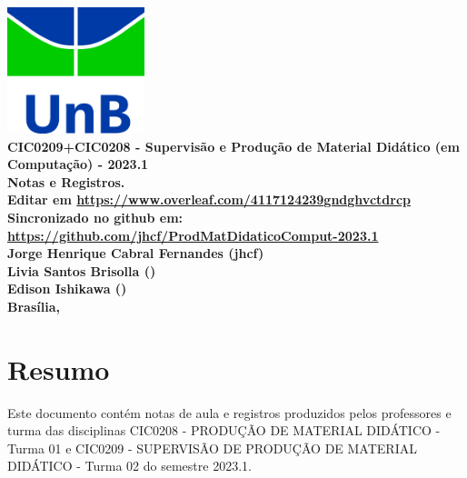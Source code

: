 \documentclass[12pt]{book}
\begin{document}
\clearpage
\thispagestyle{empty}

\begin{titlepage}
\begin{center}
 {\huge\bfseries \includegraphics[width=4cm]{unb-logo.jpg}\\
	CIC0209+CIC0208 - Supervisão e Produção de Material Didático (em Computação) - 2023.1\\
 Notas e Registros.\\
 Editar em \url{https://www.overleaf.com/4117124239gndghvctdrcp}\\
 Sincronizado no github em:
\url{https://github.com/jhcf/ProdMatDidaticoComput-2023.1}\\
 \vspace{1.5cm}
{\large	%
	Jorge Henrique Cabral Fernandes (jhcf)\\
    Livia Santos Brisolla ()\\
    Edison Ishikawa ()\\
 }
	\vspace{1.5cm}
	{\large Brasília, \DTMnow }}
\end{center}
\end{titlepage}
    \listoftodos
	\printnoidxglossary
	\tableofcontents
	\listoffigures
	\listoftables
	\clearpage
{}

\pagestyle{fancy}

	\chapter*{Resumo}

	Este documento contém notas de aula e registros  produzidos pelos professores e turma das disciplinas CIC0208 - PRODUÇÃO DE MATERIAL DIDÁTICO - Turma 01	e CIC0209 - SUPERVISÃO DE PRODUÇÃO DE MATERIAL DIDÁTICO - Turma 02 do semestre 2023.1.
	
\end{document}
